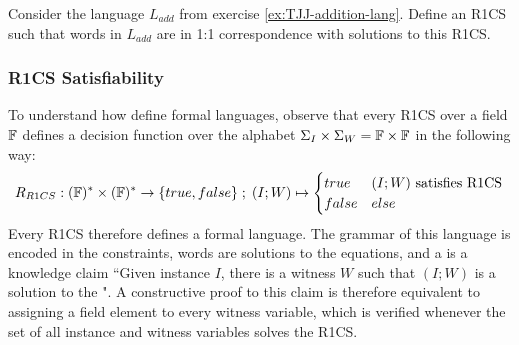 \begin{exercise} Consider the language $L_{add}$ from exercise \ref{ex:TJJ-addition-lang}. Define an R1CS such that words in $L_{add}$ are in 1:1 correspondence with solutions to this R1CS.
\end{exercise} 
\subsubsection{R1CS Satisfiability}
\label{r1cs-constructive-proofs}
To understand how  define formal languages, observe that every R1CS over a field $\mathbb{F}$ defines a decision function over the alphabet $\Sigma_I \times \Sigma_W = \mathbb{F} \times \mathbb{F}$ in the following way:
\begin{equation}
R_{R1CS} : (\mathbb{F})^* \times (\mathbb{F})^* \to \{true, false\}\;;\;
(I;W) \mapsto
\begin{cases}
true & (I;W) \text{ satisfies R1CS}\\
false & else
\end{cases}
\end{equation}
Every R1CS therefore defines a formal language. The grammar of this language is encoded in the constraints, words are solutions to the equations, and  a  is a knowledge claim ``Given instance $I$, there is a witness $W$ such that $(I;W)$ is a solution to the ". A constructive proof to this claim is therefore equivalent to assigning a field element to every witness variable, which is verified whenever the set of all instance and witness variables solves the R1CS. 

